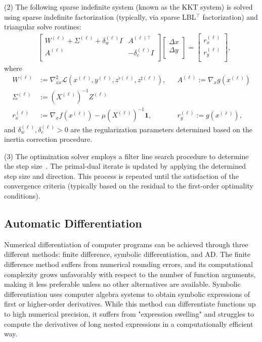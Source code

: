 \documentclass{IEEEtran4PSCC} %
\begin{document}
(2) The following sparse indefinite system (known as the KKT system) is
solved using sparse indefinite factorization (typically, via sparse
LBL$^\top$ factorization) and triangular solve routines:
\begin{align}\label{eqn:kkt-indefinite}
  &\begin{bmatrix}
    W^{(\ell)}  + \Sigma^{(\ell)} + \delta^{(\ell)}_w I& A^{(\ell)\top}\\
    A^{(\ell)} & -\delta_c^{(\ell)} I\\
  \end{bmatrix}
  \begin{bmatrix}
    \Delta x\\
    \Delta y\\
  \end{bmatrix}=
  \begin{bmatrix}
    r_x^{(\ell)}\\
    r_y^{(\ell)}\\
  \end{bmatrix},
\end{align}
where
\begin{align*}
  W^{(\ell)}
  &:=\nabla^{2}_{xx}\mathcal{L}(x^{(\ell)},y^{(\ell)},z^{\flat(\ell)},z^{\sharp(\ell)}),
  &&A^{(\ell)}:= \nabla_xg(x^{(\ell)})\\
  \Sigma^{(\ell)}&:= (X^{(\ell)})^{-1}Z^{(\ell)}\\
  r_x^{(\ell)}
  &:=\nabla_x f(x^{(\ell)}) - \mu (X^{(\ell)})^{-1} \boldsymbol{1},
  &&r_y^{(\ell)}:=g(x^{(\ell)}),
\end{align*}
and $\delta^{(\ell)}_w, \delta^{(\ell)}_c>0$ are the regularization parameters
determined based on the inertia correction procedure.

(3) The optimization solver employs a filter line search procedure to
determine the step size~\cite{wachter2006implementation}. The primal-dual iterate is updated by
applying the determined step size and direction. This process is
repeated until the satisfaction of the convergence criteria (typically based on the residual
to the first-order optimality conditions).

\subsection{Automatic Differentiation}
Numerical differentiation of computer programs can be achieved through
three different methods:  finite difference,  symbolic
differentiation, and  AD. The finite difference method suffers
from numerical rounding errors, and its computational complexity grows
unfavorably with respect to the number of function arguments, making
it less preferable unless no other alternatives are
available. Symbolic differentiation uses computer algebra systems to
obtain symbolic expressions of first or higher-order
derivatives. While this method can differentiate functions up to high
numerical precision, it suffers from "expression swelling"  and
struggles to compute the derivatives of long nested expressions in a
computationally efficient way.
\end{document}
